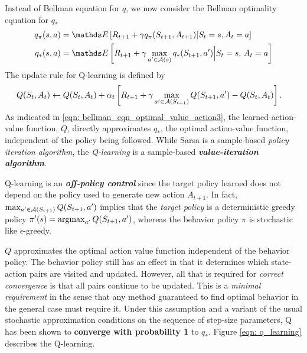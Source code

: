 \documentclass[11pt]{article}
\begin{document}
Instead of Bellman equation for $q$, we now consider the Bellman optimality equation for $q_{*}$
\begin{align}
q_{\pi}(s, a) &= \E{}{R_{t+1} + \gamma q_{\pi}(S_{t+1}, A_{t+1}) | S_{t}=s, A_{t}=a} \nonumber\\
q_{*}(s, a) &= \E{}{R_{t+1} + \gamma  \max_{a'\in \cA(s)}q_{*}(S_{t+1}, a')  \Big| S_{t} = s, \, A_{t} = a}  \label{eqn: bellman_eqn_optimal_value_action3}
\end{align} The update rule for Q-learning is defined by
\begin{align}
Q(S_{t}, A_{t}) &\leftarrow Q(S_{t}, A_{t}) + \alpha_{t}\left[R_{t+1} + \gamma \max_{a'\in {\mathcal A}(S_{t+1})}Q(S_{t+1}, a')  - Q(S_{t}, A_{t})\right]. \label{eqn: q_learning}
\end{align}
As indicated in \eqref{eqn: bellman_eqn_optimal_value_action3}, the learned action-value function, $Q$, directly approximates $q_{*}$, the optimal
action-value function, independent of the policy being followed.  While Sarsa is a sample-based \emph{policy iteration algorithm}, the \emph{Q-learning} is a sample-based \textbf{\emph{value-iteration algorithm}}. 

Q-learning is an \emph{\textbf{off-policy control}} since the target policy learned does not depend on the policy used to generate new action $A_{t+1}$. In fact, $\max_{a'\in {\mathcal A}(S_{t+1})}Q(S_{t+1}, a')$ implies that the \emph{target policy} is a deterministic greedy policy $\pi'(s) = \operatorname{argmax}_{a'}Q(S_{t+1}, a')$, whereas the behavior policy $\pi$ is stochastic like $\epsilon$-greedy. 

$Q$ approximates the optimal action value function independent of the behavior policy.  The behavior policy still has an effect in that it determines which state-action pairs are visited and updated. However, all that is required for \emph{correct convergence} is that all pairs continue to be updated. This is a \emph{minimal requirement} in the sense that any method guaranteed to find optimal behavior in the general case must require it. Under this assumption and a variant of the usual stochastic approximation conditions on the sequence of step-size parameters, Q has been shown to \textbf{converge with probability 1} to $q_{*}$. Figure \ref{eqn: q_learning} describes the Q-learning.
\end{document}
